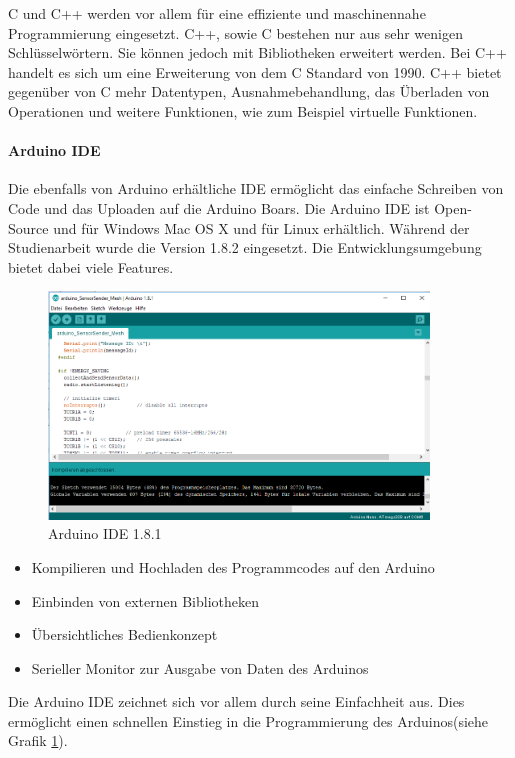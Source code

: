 C und C++ werden vor allem für eine effiziente und maschinennahe Programmierung eingesetzt.  C++, sowie C bestehen nur aus sehr wenigen Schlüsselwörtern. Sie können jedoch mit Bibliotheken erweitert werden. Bei C++ handelt es sich um eine Erweiterung von dem C Standard von 1990. C++ bietet gegenüber von C mehr Datentypen, Ausnahmebehandlung, das Überladen von Operationen und weitere Funktionen, wie zum Beispiel virtuelle Funktionen. 

\paragraph{Arduino IDE} Die ebenfalls von Arduino erhältliche IDE ermöglicht das einfache Schreiben von Code und das Uploaden auf die Arduino Boars. Die Arduino IDE ist Open-Source und für Windows Mac OS X und für Linux erhältlich. Während der Studienarbeit wurde die Version 1.8.2 eingesetzt. Die Entwicklungsumgebung bietet dabei viele Features.
\begin{figure}
	\centering
	\includegraphics[width=0.9\textwidth]{bilder/arduinoIDE}
	\caption{Arduino IDE  1.8.1}
	\label{img:ArduinoIDE}
\end{figure}

\begin{itemize}
\item Kompilieren und Hochladen des Programmcodes auf den Arduino
\item Einbinden von externen Bibliotheken
\item Übersichtliches Bedienkonzept
\item Serieller Monitor zur Ausgabe von Daten des Arduinos
\end{itemize}
Die Arduino IDE zeichnet sich vor allem durch seine Einfachheit aus. Dies ermöglicht einen schnellen Einstieg in die Programmierung des Arduinos(siehe Grafik \ref{img:ArduinoIDE}).
